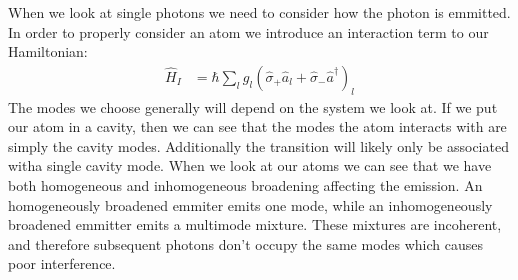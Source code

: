 When we look at single photons we need to consider how the photon is emmitted. In order to properly consider an atom we introduce an interaction term to our Hamiltonian:
\begin{align*}
	\hat{H}_I &= \hbar \sum_l g_l(\hat{\sigma}_+\hat{a}_l + \hat{\sigma}_-\hat{a}^\dagger)_l
\end{align*}
The modes we choose generally will depend on the system we look at. If we put our atom in a cavity, then we can see that the modes the atom interacts with are simply the cavity modes. Additionally the transition will likely only be associated witha  single cavity mode.
When we look at our atoms we can see that we have both homogeneous and inhomogeneous broadening affecting the emission. An homogeneously broadened emmiter emits one mode, while an inhomogeneously broadened emmitter emits a multimode mixture.
These mixtures are incoherent, and therefore subsequent photons don't occupy the same modes which causes poor interference.
